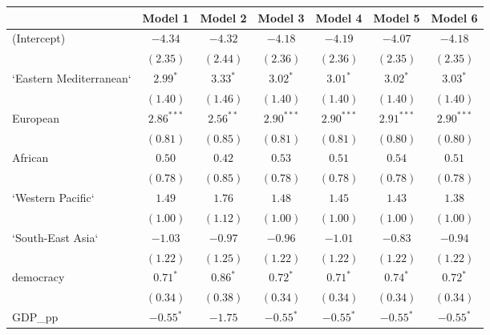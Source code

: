 
\begin{table}[!h]
\begin{center}
\begin{tabular}{l c c c c c c }
\toprule
 & Model 1 & Model 2 & Model 3 & Model 4 & Model 5 & Model 6 \\
\midrule
(Intercept)             & $-4.34$      & $-4.32$      & $-4.18$      & $-4.19$      & $-4.07$      & $-4.18$      \\
                        & $(2.35)$     & $(2.44)$     & $(2.36)$     & $(2.36)$     & $(2.35)$     & $(2.35)$     \\
`Eastern Mediterranean` & $2.99^{*}$   & $3.33^{*}$   & $3.02^{*}$   & $3.01^{*}$   & $3.02^{*}$   & $3.03^{*}$   \\
                        & $(1.40)$     & $(1.46)$     & $(1.40)$     & $(1.40)$     & $(1.40)$     & $(1.40)$     \\
European                & $2.86^{***}$ & $2.56^{**}$  & $2.90^{***}$ & $2.90^{***}$ & $2.91^{***}$ & $2.90^{***}$ \\
                        & $(0.81)$     & $(0.85)$     & $(0.81)$     & $(0.81)$     & $(0.80)$     & $(0.80)$     \\
African                 & $0.50$       & $0.42$       & $0.53$       & $0.51$       & $0.54$       & $0.51$       \\
                        & $(0.78)$     & $(0.85)$     & $(0.78)$     & $(0.78)$     & $(0.78)$     & $(0.78)$     \\
`Western Pacific`       & $1.49$       & $1.76$       & $1.48$       & $1.45$       & $1.43$       & $1.38$       \\
                        & $(1.00)$     & $(1.12)$     & $(1.00)$     & $(1.00)$     & $(1.00)$     & $(1.00)$     \\
`South-East Asia`       & $-1.03$      & $-0.97$      & $-0.96$      & $-1.01$      & $-0.83$      & $-0.94$      \\
                        & $(1.22)$     & $(1.25)$     & $(1.22)$     & $(1.22)$     & $(1.22)$     & $(1.22)$     \\
democracy               & $0.71^{*}$   & $0.86^{*}$   & $0.72^{*}$   & $0.71^{*}$   & $0.74^{*}$   & $0.72^{*}$   \\
                        & $(0.34)$     & $(0.38)$     & $(0.34)$     & $(0.34)$     & $(0.34)$     & $(0.34)$     \\
GDP\_pp                 & $-0.55^{*}$  & $-1.75$      & $-0.55^{*}$  & $-0.55^{*}$  & $-0.55^{*}$  & $-0.55^{*}$  \\

\end{tabular}
\end{center}
\end{table}
